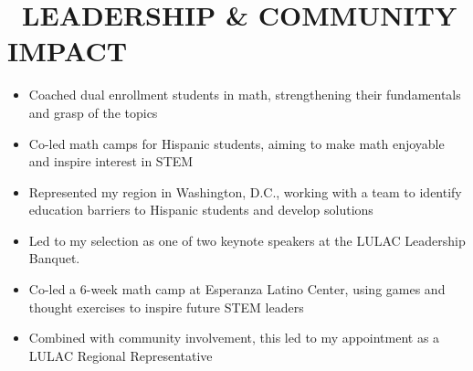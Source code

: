 \documentclass{resume}
\begin{document}
\section{\faHeartO\ LEADERSHIP \& COMMUNITY IMPACT}
\begin{itemize}[parsep=0.5ex]
    \item Coached dual enrollment students in math, strengthening their fundamentals and grasp of the topics
\end{itemize}
\begin{itemize}[parsep=0.5ex]
    \item Co-led math camps for Hispanic students, aiming to make math enjoyable and inspire interest in STEM
\end{itemize}
\begin{itemize}[parsep=0.5ex]
    \item Represented my region in Washington, D.C., working with a team to identify education barriers to Hispanic students and develop solutions
    \item Led to my selection as one of two keynote speakers at the LULAC Leadership Banquet.


\end{itemize}
\begin{itemize}[parsep=0.5ex]
    \item Co-led a 6-week math camp at Esperanza Latino Center, using games and thought exercises to inspire future STEM leaders 
    \item Combined with community involvement, this led to my appointment as a LULAC Regional Representative

\end{itemize}
\end{document}
